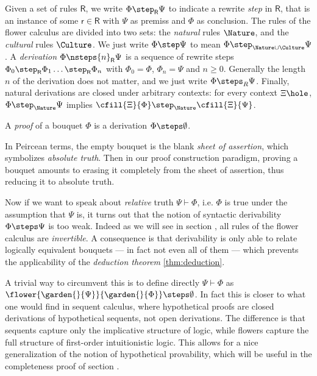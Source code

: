 \begin{definition}[Derivation]
  Given a set of rules $\mathsf{R}$, we write $\Phi \step_{\mathsf{R}} \Psi$ to
  indicate a rewrite \emph{step} in $\mathsf{R}$, that is an instance of some
  $\mathsf{r} \in \mathsf{R}$ with $\Psi$ as premiss and $\Phi$ as conclusion.
  The rules of the flower calculus are divided into two sets: the \emph{natural}
  rules $\Nature$, and the \emph{cultural} rules $\Culture$. We just write $\Phi
  \step \Psi$ to mean $\Phi \step_{\Nature\cup\Culture} \Psi$. A
  \emph{derivation} $\Phi \nsteps{n}_{\mathsf{R}} \Psi$ is a sequence of rewrite
  steps $\Phi_0 \step_{\mathsf{R}} \Phi_1 \ldots \step_{\mathsf{R}} \Phi_n$ with
  $\Phi_0 = \Phi$, $\Phi_n = \Psi$ and $n \geq 0$. Generally the length $n$ of
  the derivation does not matter, and we just write $\Phi \steps_R \Psi$.
  Finally, natural derivations are closed under arbitrary contexts: for every
  context $\Xi\hole$, $\Phi \step_\Nature \Psi$ implies $\cfill{\Xi}{\Phi}
  \step_\Nature \cfill{\Xi}{\Psi}$.
\end{definition}


\begin{definition}[Proof]
  A \emph{proof} of a bouquet $\Phi$ is a derivation $\Phi \steps \emptyset$.
\end{definition}

In Peircean terms, the empty bouquet is the blank \emph{sheet of assertion},
which symbolizes \emph{absolute truth}. Then in our proof construction paradigm,
proving a bouquet amounts to erasing it completely from the sheet of assertion,
thus reducing it to absolute truth.

Now if we want to speak about \emph{relative} truth $\Psi \vdash \Phi$, i.e.
$\Phi$ is true under the assumption that $\Psi$ is, it turns out that the notion
of syntactic derivability $\Phi \steps \Psi$ is too weak. Indeed as we will see
in section , all rules of the flower calculus are
\emph{invertible}. A consequence is that derivability is only able to relate
logically equivalent bouquets --- in fact not even all of them --- which
prevents the applicability of the \emph{deduction theorem}
\ref{thm:deduction}.

A trivial way to circumvent this is to define directly $\Psi \vdash \Phi$ as
$\flower{\garden{{}}{\Psi}}{\garden{{}}{\Phi}} \steps \emptyset$. In fact this is
closer to what one would find in sequent calculus, where hypothetical proofs are
closed derivations of hypothetical sequents, not open derivations. The
difference is that sequents capture only the implicative structure of logic,
while flowers capture the full structure of first-order intuitionistic logic.
This allows for a nice generalization of the notion of hypothetical provability,
which will be useful in the completeness proof of section
. 

